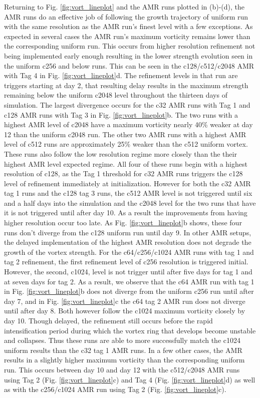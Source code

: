 Returning to Fig. \ref{fig:vort_lineplot} and the AMR runs plotted in (b)-(d), the AMR runs do an 
effective job of following the growth trajectory of uniform run with the same resolution as 
the AMR run's finest level with a few exceptions.  As expected in several cases
the AMR run's maximum vorticity remains lower than the corresponding uniform run.
This occurs from higher resolution refinement not being implemented early enough
resulting in the lower strength evolution seen in the uniform c256 and below runs.
This can be seen in the c128/c512/c2048 AMR with Tag 4 in Fig. \ref{fig:vort_lineplot}d.
The refinement levels in that run are triggers starting at day 2, that resulting delay
results in the maximum strength remaining below the uniform c2048 level throughout
the thirteen days of simulation. The largest divergence occurs for the c32 AMR runs
with Tag 1 and c128 AMR runs with Tag 3 in Fig. \ref{fig:vort_lineplot}b. 
The two runs with a highest AMR level of c2048 have a maximum vorticity
nearly 40\% weaker at day 12 than the uniform c2048 run. The other two AMR runs with a highest
AMR level of c512 runs are approximately 25\% weaker than the c512 uniform vortex. These runs also 
follow the low resolution regime more closely than the their highest AMR level expected regime. 
All four of these runs begin with a highest resolution of c128, as the Tag 1 threshold for c32 AMR runs 
triggers the c128 level of refinement immediately at initialization.  However for both the c32 AMR tag 1 runs
and the c128 tag 3 runs, the c512 AMR level is not triggered until six and a half days into the simulation
and the c2048 level for the two runs that have it is not triggered until after day 10. As a result the 
improvements from having higher resolution occur too late. As Fig. \ref{fig:vort_lineplot}b shows, these four
runs don't diverge from the c128 uniform run until day 9. In other AMR setups, the delayed implementation of
the highest AMR resolution does not degrade the growth of the vortex strength. For the c64/c256/c1024 AMR 
runs with tag 1 and tag 2 refinement, the first refinement level of c256 resolution is triggered initial. However,
the second, c1024, level is not trigger until after five days for tag 1 and at seven days for tag 2.  As a result,
we observe that the c64 AMR run with tag 1 in Fig. \ref{fig:vort_lineplot}b does not diverge from the uniform c256
run until after day 7, and in Fig. \ref{fig:vort_lineplot}c the c64 tag 2 AMR run does not diverge until after day 8.
Both however follow the c1024 maximum vorticity closely by day 10.
Though delayed, the refinement still occurs before the rapid intensification period during which
the vortex ring that develops become unstable and collapses. Thus these runs are able to more successfully
match the c1024 uniform results than the c32 tag 1 AMR runs. In a few other cases, the AMR results in a 
slightly higher maximum vorticity than the corresponding uniform run. This occurs between day 10
and day 12 with the c512/c2048 AMR runs using 
Tag 2 (Fig. \ref{fig:vort_lineplot}c) and Tag 4 (Fig. \ref{fig:vort_lineplot}d)  
as well as with the c256/c1024 AMR run using Tag 2 (Fig. \ref{fig:vort_lineplot}c).


